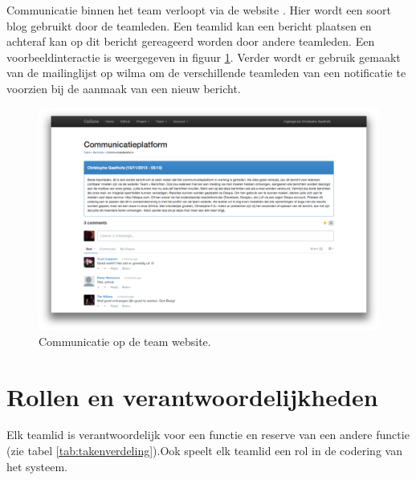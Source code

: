 Communicatie binnen het team verloopt via de website \cite{portalWebsite}. Hier wordt een soort blog gebruikt door de teamleden. Een teamlid kan een bericht plaatsen en achteraf kan op dit bericht gereageerd worden door andere teamleden. Een voorbeeldinteractie is weergegeven in figuur \ref{fig:communicatieExample}. Verder wordt er gebruik gemaakt van de mailinglijst op wilma om de verschillende teamleden van een notificatie te voorzien bij de aanmaak van een nieuw bericht. 
\begin{figure} [H]
	\centering
	\includegraphics[width = \textwidth]{ProjectOrganization/Communication.png}
	\caption{Communicatie op de team website.}
	\label{fig:communicatieExample}
\end{figure}

\section{Rollen en verantwoordelijkheden}
Elk teamlid is verantwoordelijk voor een functie en reserve van een andere functie (zie tabel \ref{tab:takenverdeling}).Ook speelt elk teamlid een rol in de codering van het systeem. 

